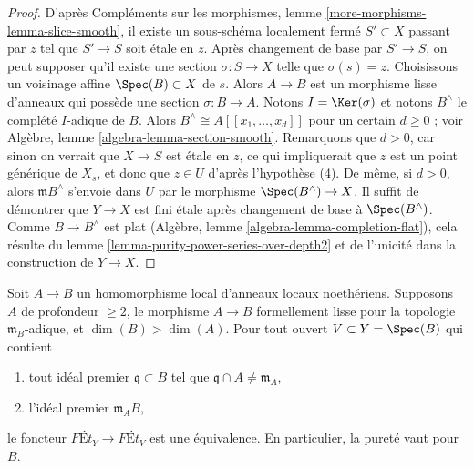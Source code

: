 \begin{proof}
\medskip\noindent
D'après Compléments sur les morphismes, lemme \ref{more-morphisms-lemma-slice-smooth},
il existe un sous-schéma localement fermé $S' \subset X$ passant par $z$
tel que $S' \to S$ soit étale en $z$. Après changement de base
par $S' \to S$, on peut supposer qu'il existe une section $\sigma : S \to X$
telle que $\sigma(s) = z$. Choisissons un voisinage affine
$\Spec(B) \subset X$ de $s$. Alors $A \to B$ est un morphisme lisse
d'anneaux qui possède une section $\sigma : B \to A$. Notons $I = \Ker(\sigma)$
et notons $B^\wedge$ le complété $I$-adique de $B$.
Alors $B^\wedge \cong A[[x_1, \ldots, x_d]]$ pour un certain $d \geq 0$ ; voir
Algèbre, lemme \ref{algebra-lemma-section-smooth}.
Remarquons que $d > 0$, car sinon on verrait que $X \to S$
est étale en $z$, ce qui impliquerait que $z$ est un point générique de
$X_s$, et donc que $z \in U$ d'après l'hypothèse (4).
De même, si $d > 0$, alors $\mathfrak m B^\wedge$ s'envoie dans
$U$ par le morphisme $\Spec(B^\wedge) \to X$.
Il suffit de démontrer que $Y \to X$ est fini étale après changement de base
à $\Spec(B^\wedge)$. Comme $B \to B^\wedge$ est plat
(Algèbre, lemme \ref{algebra-lemma-completion-flat}),
cela résulte du lemme \ref{lemma-purity-power-series-over-depth2}
et de l'unicité dans la construction de $Y \to X$.
\end{proof}

\begin{proposition}
\label{proposition-purity-smooth-over-depth2}
Soit $A \to B$ un homomorphisme local d'anneaux locaux noethériens.
Supposons $A$ de profondeur $\geq 2$, le morphisme $A \to B$ formellement lisse pour la
topologie $\mathfrak m_B$-adique, et $\dim(B) > \dim(A)$. Pour tout ouvert
$V \subset Y = \Spec(B)$ qui contient
\begin{enumerate}
\item tout idéal premier $\mathfrak q \subset B$ tel que
$\mathfrak q \cap A \not = \mathfrak m_A$,
\item l'idéal premier $\mathfrak m_A B$,
\end{enumerate}
le foncteur $\textit{F\'Et}_Y \to \textit{F\'Et}_V$
est une équivalence. En particulier, la pureté vaut pour $B$.
\end{proposition}

